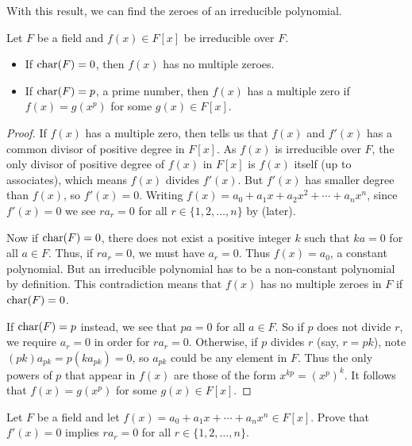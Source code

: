 With this result, we can find the zeroes of an irreducible polynomial.
\begin{theorem}\label{thrm-zeroes-of-an-irreducible}
    Let $F$ be a field and $f(x) \in F[x]$ be irreducible over $F$.
    \begin{itemize}
        \item If $\mathrm{char}(F) = 0$, then $f(x)$ has no multiple zeroes.
        \item If $\mathrm{char}(F) = p$, a prime number, then $f(x)$ has a multiple zero if $f(x) = g(x^p)$ for some $g(x) \in F[x]$.
    \end{itemize}
\end{theorem}
\begin{proof}
    If $f(x)$ has a multiple zero, then  tells us that $f(x)$ and $f'(x)$ has a common divisor of positive degree in $F[x]$. As $f(x)$ is irreducible over $F$, the only divisor of positive degree of $f(x)$ in $F[x]$ is $f(x)$ itself (up to associates), which means $f(x)$ divides $f'(x)$. But $f'(x)$ has smaller degree than $f(x)$, so $f'(x) = 0$. Writing $f(x) = a_0 + a_1x + a_2x^2 + \cdots + a_nx^n$, since $f'(x) = 0$ we see $ra_r = 0$ for all $r \in \{1, 2, \dots, n\}$ by  (later).

    Now if $\mathrm{char}(F) = 0$, there does not exist a positive integer $k$ such that $ka = 0$ for all $a \in F$. Thus, if $ra_r = 0$, we must have $a_r = 0$. Thus $f(x) = a_0$, a constant polynomial. But an irreducible polynomial has to be a non-constant polynomial by definition. This contradiction means that $f(x)$ has no multiple zeroes in $F$ if $\mathrm{char}(F) = 0$.

    If $\mathrm{char}(F) = p$ instead, we see that $pa = 0$ for all $a \in F$. So if $p$ does not divide $r$, we require $a_r = 0$ in order for $ra_r = 0$. Otherwise, if $p$ divides $r$ (say, $r = pk$), note $(pk)a_{pk} = p(ka_{pk}) = 0$, so $a_{pk}$ could be any element in $F$. Thus the only powers of $p$ that appear in $f(x)$ are those of the form $x^{kp} = \left(x^p\right)^k$. It follows that $f(x) = g(x^p)$ for some $g(x) \in F[x]$.
\end{proof}

\begin{exercise}\label{exercise-derivative-is-zero-implies-higher-terms-are-zero}
    Let $F$ be a field and let $f(x) = a_0 + a_1x + \cdots + a_nx^n \in F[x]$. Prove that $f'(x) = 0$ implies $ra_r = 0$ for all $r \in \{1, 2, \dots, n\}$.
\end{exercise}

